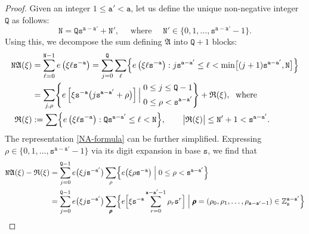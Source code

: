\documentclass[12pt, twoside]{article}
\theoremstyle{definition}
\numberwithin{equation}{section}
\begin{document}
\begin{proof} 
Given an integer $1 \leq \mathtt a' < \mathtt a$, let us define the unique non-negative integer $\mathtt Q$ as follows: 
\begin{equation} \label{division} 
\mathtt N = \mathtt Q \mathtt s^{\mathtt a-\mathtt a'} + \mathtt N', \quad \text{ where } \quad \mathtt N' \in \bigl\{0, 1, \ldots, \mathtt s^{\mathtt a - \mathtt a'} - 1 \bigr\}.  
\end{equation} 
Using this, we decompose the sum defining $\mathfrak A$ into $\mathtt Q+1$ blocks:
\begin{align} 
\mathtt N \mathfrak A(\xi) &= \sum_{\ell=0}^{\mathtt N-1} e \left(\xi \ell \mathtt s^{-\mathtt a} \right) = \sum_{j=0}^{\mathtt Q}  \sum_{\ell} \Bigl\{ e \left(\xi \ell \mathtt s^{-\mathtt a} \right) : j\mathtt s^{\mathtt a-\mathtt a'} \leq \ell < \min \bigl[(j+1) \mathtt s^{\mathtt a-\mathtt a'}, \mathtt N \bigr] \Bigr\} \nonumber  \\ 
&= \sum_{j, \rho} \Biggl\{ e \left[\xi \mathtt s^{-\mathtt a}\bigl( j \mathtt s^{\mathtt a-\mathtt a'} + \rho\bigr)\right] \Bigl| \; \begin{aligned} &0 \leq j \leq \mathtt Q-1 \\ &0 \leq \rho < \mathtt s^{\mathtt a-\mathtt a'} \end{aligned} \Biggr\} + \mathfrak R(\xi),  \; \text{ where } \label{NA-formula} \\ 
\mathfrak R(\xi) &:=  \sum  \Bigl\{ e \left(\xi \ell \mathtt s^{-\mathtt a} \right) : \mathtt Q \mathtt s^{\mathtt a-\mathtt a'} \leq \ell < \mathtt N \Bigr\}, \qquad \bigl| \mathfrak R(\xi) \bigr| \leq \mathtt N' + 1 < \mathtt s^{\mathtt a-\mathtt a'}.  \label{remainder} 
\end{align} 
The representation \eqref{NA-formula} can be further simplified. Expressing $\rho \in \{0, 1, \ldots, \mathtt s^{\mathtt a-\mathtt a'}-1\}$ via its digit expansion in base $\mathtt s$, we find that  
\begin{align} 
\mathtt N \mathfrak A(\xi) - \mathfrak R(\xi) &= \sum_{j=0}^{\mathtt Q-1} e \bigl(\xi j \mathtt s^{-\mathtt a'}\bigr) \sum_{\rho} \Bigl\{ e \bigl( \xi \rho \mathtt s^{-\mathtt a} \bigr) \; \Bigl| \; 0 \leq \rho < \mathtt s^{\mathtt a-\mathtt a'} \Bigr\} \nonumber \\ 
&= \sum_{j=0}^{\mathtt Q-1} e \bigl(\xi j \mathtt s^{-\mathtt a'} \bigr) \sum_{\pmb{\rho}} \Bigl\{ e \Bigl[\xi \mathtt s^{-\mathtt a} \sum_{r=0}^{\mathtt a-\mathtt a'-1} \rho_r \mathtt s^r \Bigr] \; \Bigl| \; \pmb{\rho} = (\rho_0, \rho_1, \ldots, \rho_{\mathtt a-\mathtt a'-1})\in \mathbb Z_{\mathtt s}^{\mathtt a-\mathtt a'} \Bigr\} \nonumber \\ 

\end{align}
\end{proof}
\end{document}
